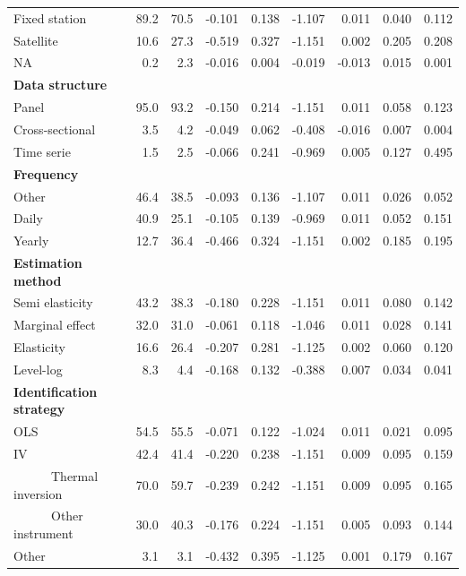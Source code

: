 \documentclass[
]{article}
\begin{document}
\begin{table}[t]
\begin{tabular*}{\linewidth}{@{\extracolsep{\fill}}l|rrrrrrrr}
   Fixed station & 89.2 & 70.5 & {-0.101} & 0.138 & -1.107 & 0.011 & 0.040 & 0.112 \\ 
   Satellite & 10.6 & 27.3 & {-0.519} & 0.327 & -1.151 & 0.002 & 0.205 & 0.208 \\ 
   NA & 0.2 & 2.3 & {-0.016} & 0.004 & -0.019 & -0.013 & 0.015 & 0.001 \\ 
{\bfseries Data structure} &  &  & {} &  &  &  &  &  \\ 
   Panel & 95.0 & 93.2 & {-0.150} & 0.214 & -1.151 & 0.011 & 0.058 & 0.123 \\ 
   Cross-sectional & 3.5 & 4.2 & {-0.049} & 0.062 & -0.408 & -0.016 & 0.007 & 0.004 \\ 
   Time serie & 1.5 & 2.5 & {-0.066} & 0.241 & -0.969 & 0.005 & 0.127 & 0.495 \\ 
{\bfseries Frequency} &  &  & {} &  &  &  &  &  \\ 
   Other & 46.4 & 38.5 & {-0.093} & 0.136 & -1.107 & 0.011 & 0.026 & 0.052 \\ 
   Daily & 40.9 & 25.1 & {-0.105} & 0.139 & -0.969 & 0.011 & 0.052 & 0.151 \\ 
   Yearly & 12.7 & 36.4 & {-0.466} & 0.324 & -1.151 & 0.002 & 0.185 & 0.195 \\ 
{\bfseries Estimation method} &  &  & {} &  &  &  &  &  \\ 
   Semi elasticity & 43.2 & 38.3 & {-0.180} & 0.228 & -1.151 & 0.011 & 0.080 & 0.142 \\ 
   Marginal effect & 32.0 & 31.0 & {-0.061} & 0.118 & -1.046 & 0.011 & 0.028 & 0.141 \\ 
   Elasticity & 16.6 & 26.4 & {-0.207} & 0.281 & -1.125 & 0.002 & 0.060 & 0.120 \\ 
   Level-log & 8.3 & 4.4 & {-0.168} & 0.132 & -0.388 & 0.007 & 0.034 & 0.041 \\ 
{\bfseries Identification strategy} &  &  & {} &  &  &  &  &  \\ 
   OLS & 54.5 & 55.5 & {-0.071} & 0.122 & -1.024 & 0.011 & 0.021 & 0.095 \\ 
   IV & 42.4 & 41.4 & {-0.220} & 0.238 & -1.151 & 0.009 & 0.095 & 0.159 \\ 
         Thermal inversion & 70.0 & 59.7 & {-0.239} & 0.242 & -1.151 & 0.009 & 0.095 & 0.165 \\ 
         Other instrument & 30.0 & 40.3 & {-0.176} & 0.224 & -1.151 & 0.005 & 0.093 & 0.144 \\ 
   Other & 3.1 & 3.1 & {-0.432} & 0.395 & -1.125 & 0.001 & 0.179 & 0.167 \\ 

\end{tabular*}
\end{table}
\end{document}
